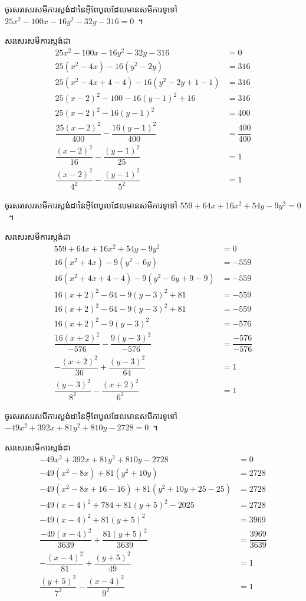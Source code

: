 %
\begin{example*}
	ចូរសរសេរសមីការស្តង់ដានៃអ៊ីពែបូលដែលមានសមីការទូទៅ $ 25 x^2-100 x-16 y^2-32 y-316=0 $~។
\end{example*}
%
\begin{answer}
	សរសេរសមីការស្ដង់ដា
	\begin{align*}
	25 x^2-100 x-16 y^2-32 y-316 &=0\\
	25(x^2-4x)-16(y^2-2y) &=316\\
	25(x^2-4x+4-4)-16(y^2-2y+1-1) &=316\\
	25(x-2)^2-100-16(y-1)^2+16 &=316\\
	25(x-2)^2-16(y-1)^2 &=400\\
	\dfrac{25(x-2)^2}{400}-\dfrac{16(y-1)^2}{400} &=\dfrac{400}{400}\\
	\dfrac{(x-2)^2}{16}-\dfrac{(y-1)^2}{25} &=1\\
	\dfrac{(x-2)^2}{4^2}-\dfrac{(y-1)^2}{5^2} &=1
	\end{align*}
\end{answer}
%
\begin{example*}
	ចូរសរសេរសមីការស្តង់ដានៃអ៊ីពែបូលដែលមានសមីការទូទៅ $ 559 + 64 x + 16 x^2 + 54 y - 9 y^2=0 $~។
\end{example*}
%
\begin{answer}
	សរសេរសមីការស្ដង់ដា
	\begin{align*}
	559 + 64 x + 16 x^2 + 54 y - 9 y^2 &=0\\
	16(x^2+4x)-9(y^2-6y) &=-559\\
	16(x^2+4x+4-4)-9(y^2-6y+9-9) &=-559\\
	16(x+2)^2-64-9(y-3)^2+81 &=-559\\
	16(x+2)^2-64-9(y-3)^2+81 &=-559\\
	16(x+2)^2-9(y-3)^2 &=-576\\
	\dfrac{16(x+2)^2}{-576}-\dfrac{9(y-3)^2}{-576} &=\dfrac{-576}{-576}\\
	-\dfrac{(x+2)^2}{36}+\dfrac{(y-3)^2}{64} &=1\\
	\dfrac{(y-3)^2}{8^2}-\dfrac{(x+2)^2}{6^2} &=1
	\end{align*}
\end{answer}
%
\begin{example*}
	ចូរសរសេរសមីការស្តង់ដានៃអ៊ីពែបូលដែលមានសមីការទូទៅ $ -49 x^2+392 x+81 y^2+810 y-2728=0 $~។
\end{example*}
%
\begin{answer}
	សរសេរសមីការស្ដង់ដា
	\begin{align*}
	-49 x^2+392 x+81 y^2+810 y-2728 &=0\\
	-49(x^2-8x)+81(y^2+10y) &=2728\\
	-49(x^2-8x+16-16)+81(y^2+10y+25-25) &=2728\\
	-49(x-4)^2+784+81(y+5)^2-2025 &=2728\\
	-49(x-4)^2+81(y+5)^2 &=3969\\
	\dfrac{-49(x-4)^2}{3639}+\dfrac{81(y+5)^2}{3639} &=\dfrac{3969}{3639}\\
	-\dfrac{(x-4)^2}{81}+\dfrac{(y+5)^2}{49} &=1\\
	\dfrac{(y+5)^2}{7^2}-\dfrac{(x-4)^2}{9^2} &=1
	\end{align*}
\end{answer}
%
